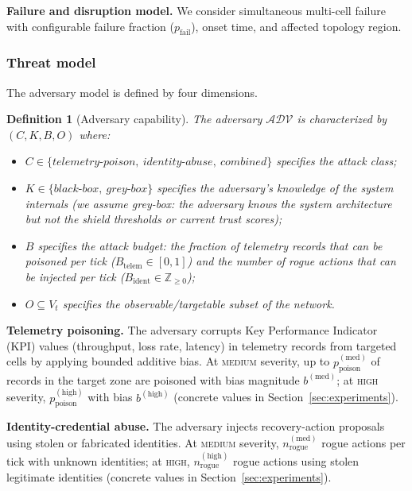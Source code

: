 \documentclass[10pt,journal,compsoc]{IEEEtran}
\newtheorem{definition}{Definition}
\begin{document}
\noindent\textbf{Failure and disruption model.}
We consider simultaneous multi-cell failure with configurable failure fraction ($p_{\mathrm{fail}}$), onset time, and affected topology region.

\subsubsection{Threat model}
\label{sec:threat_model}

The adversary model is defined by four dimensions.

\begin{definition}[Adversary capability]
The adversary $\mathcal{ADV}$ is characterized by $(C, K, B, O)$ where:
\begin{itemize}
    \item $C \in \{\textit{telemetry-poison},\ \textit{identity-abuse},\ \textit{combined}\}$ specifies the attack class;
    \item $K \in \{\textit{black-box},\ \textit{grey-box}\}$ specifies the adversary's knowledge of the system internals (we assume grey-box: the adversary knows the system architecture but not the shield thresholds or current trust scores);
    \item $B$ specifies the attack budget: the fraction of telemetry records that can be poisoned per tick ($B_{\mathrm{telem}} \in [0,1]$) and the number of rogue actions that can be injected per tick ($B_{\mathrm{ident}} \in \mathbb{Z}_{\ge 0}$);
    \item $O \subseteq V_t$ specifies the observable/targetable subset of the network.
\end{itemize}
\end{definition}

\noindent\textbf{Telemetry poisoning.}
The adversary corrupts Key Performance Indicator (KPI) values (throughput, loss rate, latency) in telemetry records from targeted cells by applying bounded additive bias.
At \textsc{medium} severity, up to $p_{\mathrm{poison}}^{(\mathrm{med})}$ of records in the target zone are poisoned with bias magnitude $b^{(\mathrm{med})}$; at \textsc{high} severity, $p_{\mathrm{poison}}^{(\mathrm{high})}$ with bias $b^{(\mathrm{high})}$ (concrete values in Section~\ref{sec:experiments}).

\noindent\textbf{Identity-credential abuse.}
The adversary injects recovery-action proposals using stolen or fabricated identities.
At \textsc{medium} severity, $n_{\mathrm{rogue}}^{(\mathrm{med})}$ rogue actions per tick with unknown identities; at \textsc{high}, $n_{\mathrm{rogue}}^{(\mathrm{high})}$ rogue actions using stolen legitimate identities (concrete values in Section~\ref{sec:experiments}).
\end{document}
